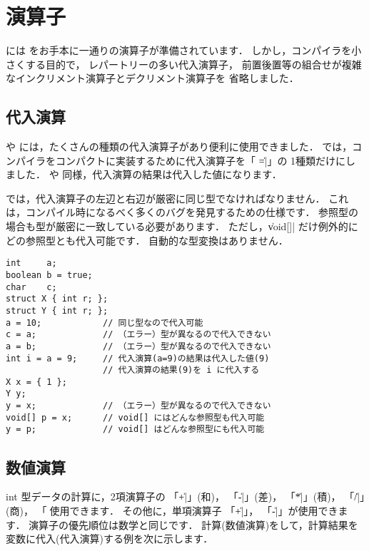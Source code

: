 \section{演算子}

\cmml には \cl をお手本に一通りの演算子が準備されています．
しかし，コンパイラを小さくする目的で，
レパートリーの多い代入演算子，
前置後置等の組合せが複雑なインクリメント演算子とデクリメント演算子を
省略しました．

\subsection{代入演算}

\cl や \javal には，たくさんの種類の代入演算子があり便利に使用できました．
\cmml では，コンパイラをコンパクトに実装するために代入演算子を「 \|=|」の
1種類だけにしました．
\cl や \javal 同様，代入演算の結果は代入した値になります．

\cmml では，代入演算子の左辺と右辺が厳密に同じ型でなければなりません．
これは，コンパイル時になるべく多くのバグを発見するための仕様です．
参照型の場合も型が厳密に一致している必要があります．
ただし，\|void[]| だけ例外的にどの参照型とも代入可能です．
自動的な型変換はありません．

\begin{mylist}
\begin{verbatim}
int     a;
boolean b = true;
char    c;
struct X { int r; };
struct Y { int r; };
a = 10;            // 同じ型なので代入可能
c = a;             // （エラー）型が異なるので代入できない
a = b;             // （エラー）型が異なるので代入できない
int i = a = 9;     // 代入演算(a=9)の結果は代入した値(9)
                   // 代入演算の結果(9)を i に代入する
X x = { 1 };
Y y;
y = x;             // （エラー）型が異なるので代入できない
void[] p = x;      // void[] にはどんな参照型も代入可能
y = p;             // void[] はどんな参照型にも代入可能
\end{verbatim}
\end{mylist}

\subsection{数値演算}

int 型データの計算に，2項演算子の
「\|+|」(和)，
「\|-|」(差)，
「\|*|」(積)，
「\|/|」(商)，
「\|%
が使用できます．
その他に，単項演算子
「\|+|」，
「\|-|」が使用できます．
演算子の優先順位は数学と同じです．
計算(数値演算)をして，計算結果を変数に代入(代入演算)する例を次に示します．

